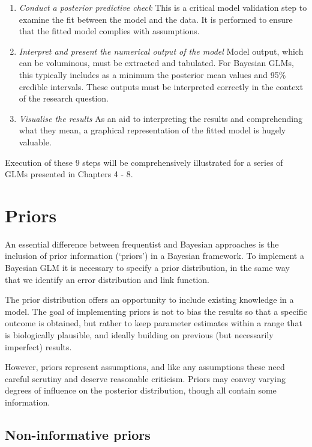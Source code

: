 \documentclass[
]{book}
\begin{document}
\begin{enumerate}
\item
  \emph{Conduct a posterior predictive check}
  This is a critical model validation step to examine the fit between the model and the data. It is performed to ensure that the fitted model complies with assumptions.
\item
  \emph{Interpret and present the numerical output of the model}
  Model output, which can be voluminous, must be extracted and tabulated. For Bayesian GLMs, this typically includes as a minimum the posterior mean values and 95\% credible intervals. These outputs must be interpreted correctly in the context of the research question.
\item
  \emph{Visualise the results}
  As an aid to interpreting the results and comprehending what they mean, a graphical representation of the fitted model is hugely valuable.
\end{enumerate}

Execution of these 9 steps will be comprehensively illustrated for a series of GLMs presented in Chapters 4 - 8.

\hypertarget{intro-priors}{%
\section{Priors}\label{intro-priors}}

An essential difference between frequentist and Bayesian approaches is the inclusion of prior information (`priors') in a Bayesian framework. To implement a Bayesian GLM it is necessary to specify a prior distribution, in the same way that we identify an error distribution and link function.

The prior distribution offers an opportunity to include existing knowledge in a model. The goal of implementing priors is not to bias the results so that a specific outcome is obtained, but rather to keep parameter estimates within a range that is biologically plausible, and ideally building on previous (but necessarily imperfect) results.

However, priors represent assumptions, and like any assumptions these need careful scrutiny and deserve reasonable criticism. Priors may convey varying degrees of influence on the posterior distribution, though all contain some information.

\hypertarget{flat-priors}{%
\subsection{Non-informative priors}\label{flat-priors}}
\end{document}
